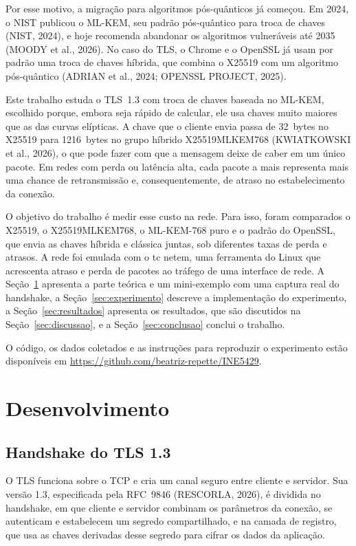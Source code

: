 \documentclass[12pt,a4paper]{article}
\begin{document}
Por esse motivo, a migração para algoritmos pós-quânticos já começou. Em
2024, o NIST publicou o ML-KEM,
seu padrão pós-quântico para troca de chaves (NIST, 2024), e hoje
recomenda abandonar os algoritmos vulneráveis até 2035 (MOODY et al.,
2026). No caso do TLS, o Chrome e o OpenSSL já usam por padrão uma troca
de chaves híbrida, que combina o X25519 com um algoritmo pós-quântico
(ADRIAN et al., 2024; OPENSSL PROJECT, 2025).

Este trabalho estuda o TLS~1.3 com troca de chaves baseada no ML-KEM,
escolhido porque, embora seja rápido de calcular, ele usa chaves muito
maiores que as das curvas elípticas. A chave que o cliente envia passa de
32~bytes no X25519 para 1216~bytes no grupo híbrido
X25519MLKEM768 (KWIATKOWSKI et al., 2026), o que pode fazer com
que a mensagem deixe de caber em um único pacote. Em redes com perda ou
latência alta, cada pacote a mais representa mais uma chance de
retransmissão e, consequentemente, de atraso no estabelecimento da
conexão.

O objetivo do trabalho é medir esse custo na rede. Para isso, foram
comparados o X25519, o X25519MLKEM768, o ML-KEM-768 puro e o padrão do
OpenSSL, que envia as chaves híbrida e clássica juntas, sob diferentes
taxas de perda e atrasos. A rede foi emulada com o tc netem, uma ferramenta
do Linux que acrescenta atraso e perda de pacotes ao tráfego de uma
interface de rede. A Seção~\ref{sec:desenvolvimento}
apresenta a parte teórica e um mini-exemplo com uma captura real do
handshake, a Seção~\ref{sec:experimento} descreve a implementação do
experimento, a Seção~\ref{sec:resultados} apresenta os resultados, que são
discutidos na Seção~\ref{sec:discussao}, e a Seção~\ref{sec:conclusao}
conclui o trabalho.

O código, os dados coletados e as instruções para reproduzir o experimento
estão disponíveis em \url{https://github.com/beatriz-repette/INE5429}.


\section{Desenvolvimento}
\label{sec:desenvolvimento}


\setcounter{subsection}{0}
\subsection{Handshake do TLS 1.3}
\label{sec:tls13}

O TLS funciona sobre o TCP e cria um canal seguro entre cliente e
servidor. Sua versão 1.3, especificada pela RFC~9846 (RESCORLA, 2026), é
dividida no handshake, em que cliente e servidor combinam os parâmetros da
conexão, se autenticam e estabelecem um segredo compartilhado, e na camada
de registro, que usa as chaves derivadas desse segredo para cifrar os dados
da aplicação.
\end{document}
